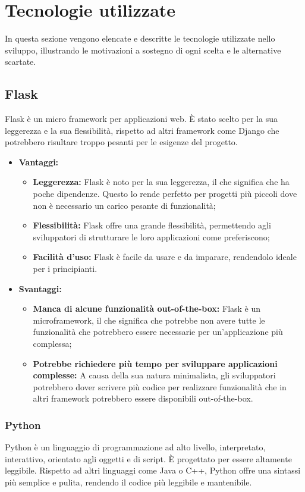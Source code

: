 \documentclass[10pt, a4paper]{article}
\begin{document}
\newpage
\section{Tecnologie utilizzate}
In questa sezione vengono elencate e descritte le tecnologie utilizzate nello sviluppo, illustrando le motivazioni a sostegno di ogni scelta e le alternative scartate.

\subsection{Flask}
Flask è un micro framework per applicazioni web. È stato scelto per la sua leggerezza e la sua flessibilità, rispetto ad altri framework come Django che potrebbero risultare troppo pesanti per le esigenze del progetto.

\begin{itemize}
\item \textbf{Vantaggi:}
\begin{itemize}
\item \textbf{Leggerezza:} Flask è noto per la sua leggerezza, il che significa che ha poche dipendenze. Questo lo rende perfetto per progetti più piccoli dove non è necessario un carico pesante di funzionalità;
\item \textbf{Flessibilità:} Flask offre una grande flessibilità, permettendo agli sviluppatori di strutturare le loro applicazioni come preferiscono;
\item \textbf{Facilità d'uso:} Flask è facile da usare e da imparare, rendendolo ideale per i principianti.
\end{itemize}
\item \textbf{Svantaggi:}
\begin{itemize}
\item \textbf{Manca di alcune funzionalità out-of-the-box:} Flask è un microframework, il che significa che potrebbe non avere tutte le funzionalità che potrebbero essere necessarie per un'applicazione più complessa;
\item \textbf{Potrebbe richiedere più tempo per sviluppare applicazioni complesse:} A causa della sua natura minimalista, gli sviluppatori potrebbero dover scrivere più codice per realizzare funzionalità che in altri framework potrebbero essere disponibili out-of-the-box.
\end{itemize}
\end{itemize}

\subsubsection{Python}
Python è un linguaggio di programmazione ad alto livello, interpretato, interattivo, orientato agli oggetti e di script. È progettato per essere altamente leggibile. Rispetto ad altri linguaggi come Java o C++, Python offre una sintassi più semplice e pulita, rendendo il codice più leggibile e mantenibile.
\end{document}
